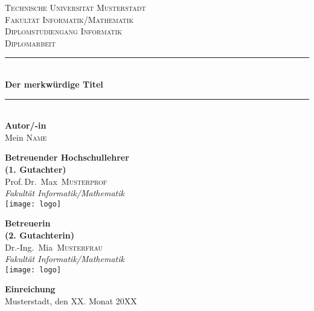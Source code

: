 
\begin{titlepage}
	\begin{center}
	\textsc{\Large Technische Universität Musterstadt}\\[0.5cm]
	\textsc{Fakultät Informatik/Mathematik}\\
	\textsc{Diplomstudiengang Informatik}\\[3cm]
	\textsc{\LARGE Diplomarbeit}\\[0.5cm]
	\newcommand{\HRule}{\rule{\linewidth}{0.5mm}}
	\HRule \\[0.4cm]
	{ \huge \bfseries Der merkwürdige Titel}\\[0.2cm]
	\HRule \\[2cm]
	\textbf{Autor/-in}\\[0.3cm]
	Mein \textsc{Name}\\[2cm]
	\begin{minipage}{0.4\textwidth}
		\begin{flushleft}
			\textbf{Betreuender Hochschullehrer\\(1. Gutachter)}\\[0.3cm]
			Prof.\,Dr.~Max~\textsc{Musterprof}\\
			\emph{Fakultät Informatik/Mathematik}\\[0.2cm]
			\texttt{[image: logo]}
		\end{flushleft}
	\end{minipage}
	\hfill
	\begin{minipage}{0.4\textwidth}
		\begin{flushright}
			\textbf{Betreuerin\\(2. Gutachterin)}\\[0.3cm]
			Dr.-Ing.~Mia~\textsc{Musterfrau}\\
			\emph{Fakultät Informatik/Mathematik}\\[0.2cm]
			\texttt{[image: logo]}
		\end{flushright}
	\end{minipage}
	\vfill
	\textbf{Einreichung}\\[0.3cm]
	Musterstadt, den XX. Monat 20XX
	\end{center}
\end{titlepage}
